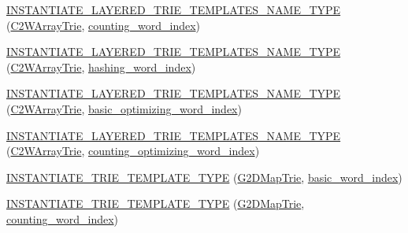 \begin{DoxyCompactItemize}
\item 
\hyperlink{namespaceuva_1_1smt_1_1bpbd_1_1server_1_1lm_a48bbe5a4cf0cf2b8ab7a4ef883141c05}{I\+N\+S\+T\+A\+N\+T\+I\+A\+T\+E\+\_\+\+L\+A\+Y\+E\+R\+E\+D\+\_\+\+T\+R\+I\+E\+\_\+\+T\+E\+M\+P\+L\+A\+T\+E\+S\+\_\+\+N\+A\+M\+E\+\_\+\+T\+Y\+P\+E} (\hyperlink{classuva_1_1smt_1_1bpbd_1_1server_1_1lm_1_1_c2_w_array_trie}{C2\+W\+Array\+Trie}, \hyperlink{classuva_1_1smt_1_1bpbd_1_1server_1_1lm_1_1dictionary_1_1counting__word__index}{counting\+\_\+word\+\_\+index})
\item 
\hyperlink{namespaceuva_1_1smt_1_1bpbd_1_1server_1_1lm_a20ff20e531b53e5e096f9bc365c3616c}{I\+N\+S\+T\+A\+N\+T\+I\+A\+T\+E\+\_\+\+L\+A\+Y\+E\+R\+E\+D\+\_\+\+T\+R\+I\+E\+\_\+\+T\+E\+M\+P\+L\+A\+T\+E\+S\+\_\+\+N\+A\+M\+E\+\_\+\+T\+Y\+P\+E} (\hyperlink{classuva_1_1smt_1_1bpbd_1_1server_1_1lm_1_1_c2_w_array_trie}{C2\+W\+Array\+Trie}, \hyperlink{classuva_1_1smt_1_1bpbd_1_1server_1_1lm_1_1dictionary_1_1hashing__word__index}{hashing\+\_\+word\+\_\+index})
\item 
\hyperlink{namespaceuva_1_1smt_1_1bpbd_1_1server_1_1lm_a8e79c651c648639403d8e59e4182debd}{I\+N\+S\+T\+A\+N\+T\+I\+A\+T\+E\+\_\+\+L\+A\+Y\+E\+R\+E\+D\+\_\+\+T\+R\+I\+E\+\_\+\+T\+E\+M\+P\+L\+A\+T\+E\+S\+\_\+\+N\+A\+M\+E\+\_\+\+T\+Y\+P\+E} (\hyperlink{classuva_1_1smt_1_1bpbd_1_1server_1_1lm_1_1_c2_w_array_trie}{C2\+W\+Array\+Trie}, \hyperlink{namespaceuva_1_1smt_1_1bpbd_1_1server_1_1lm_1_1dictionary_a3001583c904eec702b4a4125082a7ecd}{basic\+\_\+optimizing\+\_\+word\+\_\+index})
\item 
\hyperlink{namespaceuva_1_1smt_1_1bpbd_1_1server_1_1lm_a0c0a402cebc41ecb14151d6ab2192097}{I\+N\+S\+T\+A\+N\+T\+I\+A\+T\+E\+\_\+\+L\+A\+Y\+E\+R\+E\+D\+\_\+\+T\+R\+I\+E\+\_\+\+T\+E\+M\+P\+L\+A\+T\+E\+S\+\_\+\+N\+A\+M\+E\+\_\+\+T\+Y\+P\+E} (\hyperlink{classuva_1_1smt_1_1bpbd_1_1server_1_1lm_1_1_c2_w_array_trie}{C2\+W\+Array\+Trie}, \hyperlink{namespaceuva_1_1smt_1_1bpbd_1_1server_1_1lm_1_1dictionary_a61cbd647b15de785ccf4cdd26661c366}{counting\+\_\+optimizing\+\_\+word\+\_\+index})
\item 
\hyperlink{namespaceuva_1_1smt_1_1bpbd_1_1server_1_1lm_a7588cf5d72288750783a41730e27f3b0}{I\+N\+S\+T\+A\+N\+T\+I\+A\+T\+E\+\_\+\+T\+R\+I\+E\+\_\+\+T\+E\+M\+P\+L\+A\+T\+E\+\_\+\+T\+Y\+P\+E} (\hyperlink{classuva_1_1smt_1_1bpbd_1_1server_1_1lm_1_1_g2_d_map_trie}{G2\+D\+Map\+Trie}, \hyperlink{classuva_1_1smt_1_1bpbd_1_1server_1_1lm_1_1dictionary_1_1basic__word__index}{basic\+\_\+word\+\_\+index})
\item 
\hyperlink{namespaceuva_1_1smt_1_1bpbd_1_1server_1_1lm_a89ac5911f19db7c898cbadc503a71bdb}{I\+N\+S\+T\+A\+N\+T\+I\+A\+T\+E\+\_\+\+T\+R\+I\+E\+\_\+\+T\+E\+M\+P\+L\+A\+T\+E\+\_\+\+T\+Y\+P\+E} (\hyperlink{classuva_1_1smt_1_1bpbd_1_1server_1_1lm_1_1_g2_d_map_trie}{G2\+D\+Map\+Trie}, \hyperlink{classuva_1_1smt_1_1bpbd_1_1server_1_1lm_1_1dictionary_1_1counting__word__index}{counting\+\_\+word\+\_\+index})

\end{DoxyCompactItemize}
